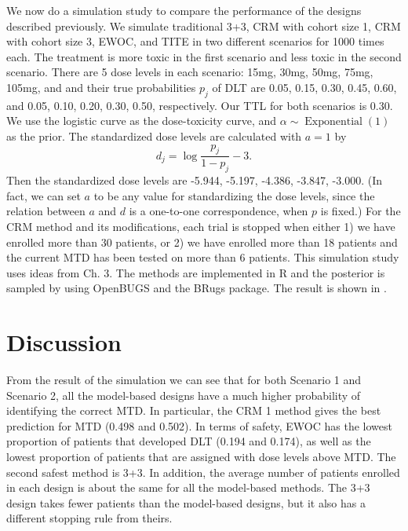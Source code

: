 \documentclass[12pt]{article}
\begin{document}
We now do a simulation study to compare the performance of the designs described previously.
We simulate traditional 3+3, CRM with cohort size 1, CRM with cohort size 3, EWOC, and TITE in two different scenarios for 1000 times each.
The treatment is more toxic in the first scenario and less toxic in the second scenario.
There are 5 dose levels in each scenario: 15mg, 30mg, 50mg, 75mg, 105mg, and and their true probabilities $p_j$ of DLT are 0.05, 0.15, 0.30, 0.45, 0.60, and 0.05, 0.10, 0.20, 0.30, 0.50, respectively.
Our TTL for both scenarios is 0.30.
We use the logistic curve as the dose-toxicity curve, and $\alpha \sim \operatorname{Exponential}(1)$ as the prior.
The standardized dose levels are calculated with $a=1$ by
\[
  d_j = \log \frac{p_j}{1-p_j} - 3.
\]
Then the standardized dose levels are -5.944, -5.197, -4.386, -3.847, -3.000.
(In fact, we can set $a$ to be any value for standardizing the dose levels, since the relation between $a$ and $d$ is a one-to-one correspondence, when $p$ is fixed.)
For the CRM method and its modifications, each trial is stopped when either 1) we have enrolled more than 30 patients, or 2) we have enrolled more than 18 patients and the current MTD has been tested on more than 6 patients.
This simulation study uses ideas from \cite{berry} Ch. 3.
The methods are implemented in R and the posterior is sampled by using OpenBUGS and the BRugs package.
The result is shown in .


\section{Discussion} \label{secDiscuss}

From the result of the simulation we can see that for both Scenario 1 and Scenario 2, all the model-based designs have a much higher probability of identifying the correct MTD.
In particular, the CRM 1 method gives the best prediction for MTD (0.498 and 0.502).
In terms of safety, EWOC has the lowest proportion of patients that developed DLT (0.194 and 0.174),
as well as the lowest proportion of patients that are assigned with dose levels above MTD.
The second safest method is 3+3.
In addition, the average number of patients enrolled in each design is about the same for all the model-based methods.
The 3+3 design takes fewer patients than the model-based designs, but it also has a different stopping rule from theirs.
\end{document}
